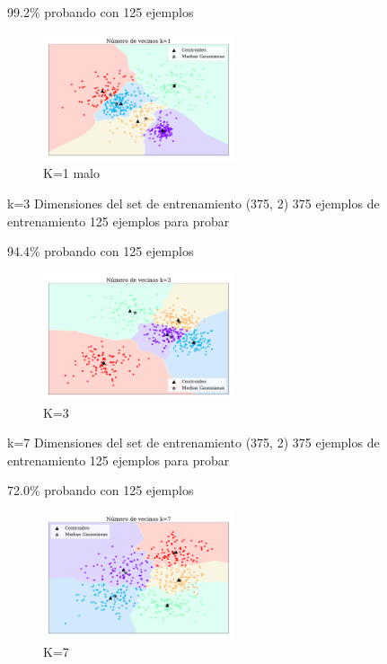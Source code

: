 99.2\% probando con 125 ejemplos

\begin{figure}[H]
    \centering
    \includegraphics[width=0.5\textwidth]{ejer_4_K-1_si_converge.pdf}
    \caption{K=1 malo}
    \label{fig:ejer4_k_1}
\end{figure} 


k=3
Dimensiones del set de entrenamiento  (375, 2)
375 ejemplos de entrenamiento
125 ejemplos para probar

94.4\% probando con 125 ejemplos

\begin{figure}[H]
    \centering
    \includegraphics[width=0.5\textwidth]{ejer_4_K-3_si_converge.pdf}
    \caption{K=3 }
    \label{fig:ejer4_k_3}
\end{figure} 

k=7
Dimensiones del set de entrenamiento  (375, 2)
375 ejemplos de entrenamiento
125 ejemplos para probar

72.0\% probando con 125 ejemplos
\begin{figure}[H]
    \centering
    \includegraphics[width=0.5\textwidth]{ejer_4_K-7_si_converge.pdf}
    \caption{K=7 }
    \label{fig:ejer4_k_7}
\end{figure} 



